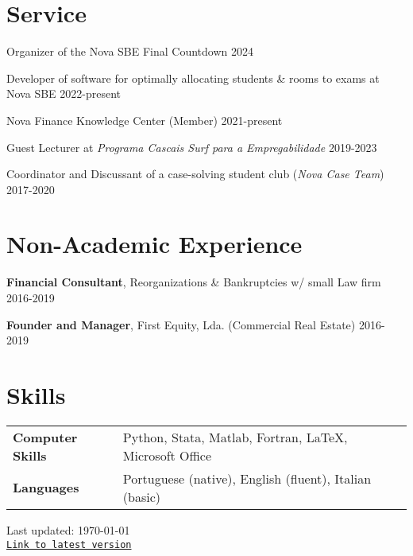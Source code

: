 \documentclass[letterpaper]{article}
\def\footerlink{https://miguelcfoliveira.github.io/CV/CV.pdf}
\newenvironment{itemize*}{
  \begin{list}{}{
    \setlength{\leftmargin}{1.5em}
  }
}{
  \end{list}
}
\begin{document}
\section*{Service}
\vspace{-0.2in}
\hrulefill
\begin{itemize*}
\item Organizer of the Nova SBE Final Countdown \hfill 2024
\item Developer of software for optimally allocating students \& rooms to exams at Nova SBE \hfill 2022-present
\item Nova Finance Knowledge Center (Member) \hfill 2021-present
\item Guest Lecturer at \textit{Programa Cascais Surf para a Empregabilidade} \hfill 2019-2023
\item Coordinator and Discussant of a case-solving student club (\textit{Nova Case Team}) \hfill 2017-2020
\end{itemize*}

\section*{Non-Academic Experience}
\vspace{-0.2in}
\hrulefill

\begin{itemize*}
\item \textbf{Financial Consultant}, Reorganizations \& Bankruptcies w/ small Law firm \hfill 2016-2019
\item \textbf{Founder and Manager}, First Equity, Lda. (Commercial Real Estate) \hfill 2016-2019
\end{itemize*}

\section*{Skills}
\vspace{-0.2in}
\hrulefill
\renewcommand{\arraystretch}{1.25}
\begin{table}[h]
 \vspace*{-\baselineskip}
 \hspace{0.1in}
\begin{tabular}{l l}
\textbf{Computer Skills} & Python, Stata, Matlab, Fortran, \LaTeX, Microsoft Office \\
\textbf{Languages} & Portuguese (native), English (fluent), Italian (basic)
\end{tabular}
\end{table}

\begin{center}
  \begin{footnotesize}
    Last updated: \today \\
    \href{\footerlink}{\texttt{Link to latest version}}
  \end{footnotesize}
\end{center}
\end{document}
